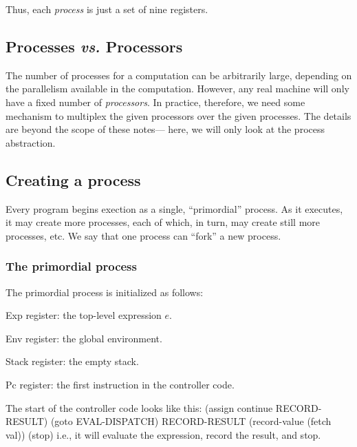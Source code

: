 Thus, each {\em process\/} is just a set of nine registers.

\subsection{Processes {\em vs.\/} Processors}

The number of processes for a computation can be arbitrarily large,
depending on the parallelism available in the computation.  However,
any real machine will only have a fixed number of {\em processors\/}.
In practice, therefore, we need some mechanism to multiplex the given
processors over the given processes.  The details are beyond the scope
of these notes--- here, we will only look at the process abstraction.

\subsection{Creating a process}

Every program begins exection as a single, ``primordial'' process.  As
it executes, it may create more processes, each of which, in turn, may
create still more processes, etc.  We say that one process can
``fork'' a new process.

\subsubsection{The primordial process}

The primordial process is initialized as follows:

 \begin{tightlist}

 \item {\cf Exp} register: the top-level expression $e$.

 \item {\cf Env} register: the global environment.

 \item {\cf Stack} register: the empty stack.

 \item {\cf Pc} register: the first instruction in the controller code.

 \end{tightlist}

The start of the controller code looks like this:
\beginlisp
  (assign continue RECORD-RESULT)
  (goto EVAL-DISPATCH)
\null
RECORD-RESULT
  (record-value (fetch val))
  (stop)
\endlisp
i.e., it will evaluate the expression, record the result, and stop.

